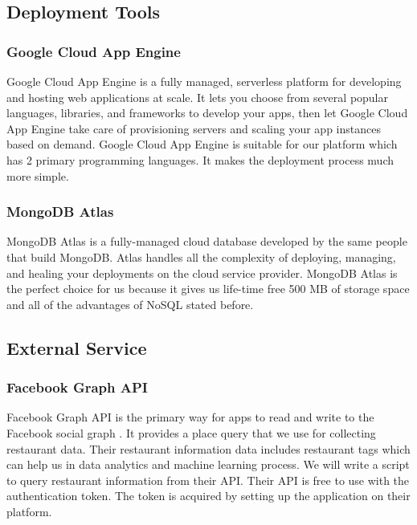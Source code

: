 \documentclass[12pt,oneside,openright,a4paper]{cpe-english-project}
\begin{document}
\subsection{Deployment Tools}

\subsubsection{Google Cloud App Engine}

Google Cloud App Engine is a fully managed, serverless platform for developing and hosting web applications at scale. It lets you choose from several popular languages, libraries, and frameworks to develop your apps, then let Google Cloud App Engine take care of provisioning servers and scaling your app instances based on demand. \cite{GoogleAppEngineDocumentation} Google Cloud App Engine is suitable for our platform which has 2 primary programming languages. It makes the deployment process much more simple.

\subsubsection{MongoDB Atlas}

MongoDB Atlas is a fully-managed cloud database developed by the same people that build MongoDB. Atlas handles all the complexity of deploying, managing, and healing your deployments on the cloud service provider. \cite{MongoDBAtlas} MongoDB Atlas is the perfect choice for us because it gives us life-time free 500 MB of storage space and all of the advantages of NoSQL stated before.


\subsection{External Service}

\subsubsection{Facebook Graph API}

Facebook Graph API is the primary way for apps to read and write to the Facebook social graph \cite{GraphAPI}. It provides a place query that we use for collecting restaurant data. Their restaurant information data includes restaurant tags which can help us in data analytics and machine learning process. We will write a script to query restaurant information from their API. Their API is free to use with the authentication token. The token is acquired by setting up the application on their platform.
\end{document}
